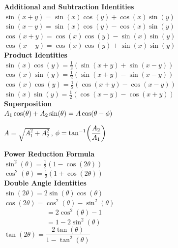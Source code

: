 \documentclass[11pt]{article}
\begin{document}
\begin{multicols}{2}
  \textbf{Additional and Subtraction Identities}\\
  \(\sin(x + y) = \sin(x)\cos(y) + \cos(x)\sin(y)\) \vspace{6pt} \\
  \(\sin(x - y) = \sin(x)\cos(y) - \cos(x)\sin(y)\) \vspace{6pt} \\
  \(\cos(x + y) = \cos(x)\cos(y) - \sin(x)\sin(y)\) \vspace{6pt} \\
  \(\cos(x - y) = \cos(x)\cos(y) + \sin(x)\sin(y)\) \\

  \textbf{Product Identities}\\
  \(\sin(x)\cos(y) = \frac{1}{2}(\sin(x + y) + \sin(x - y))\) \vspace{6pt}\\
  \(\cos(x)\sin(y) = \frac{1}{2}(\sin(x + y) - \sin(x - y))\) \vspace{6pt}\\
  \(\cos(x)\cos(y) = \frac{1}{2}(\cos(x + y) - \cos(x - y))\) \vspace{6pt}\\
  \(\sin(x)\sin(y) = \frac{1}{2}(\cos(x - y) - \cos(x + y))\) \\

  \textbf{Superposition}\\
  \(A_1\cos(\theta) + A_2\sin(\theta) = A\,{\cos}{\left( \theta - \phi \right)}\)

  \(A = \sqrt{A_1^2 + A_2^2}\,\),
  \(\phi = {\tan^{-1}}{\left( \dfrac{A_2}{A_1} \right)}\)

  \columnbreak

  \textbf{Power Reduction Formula}\\
  \(\sin^2(\theta) = \frac{1}{2}(1 - \cos(2\theta))\) \vspace{6pt}\\
  \(\cos^2(\theta) = \frac{1}{2}(1 + \cos(2\theta))\) \\

  \textbf{Double Angle Identities}\\
  \(\sin(2\theta) = 2\sin(\theta)\cos(\theta)\) \\
  \(\cos(2\theta) = \cos^2(\theta) - \sin^2(\theta)\) \\
  \(\textrm{ }\textrm{ }\textrm{ }\textrm{ }\textrm{ }\textrm{ }\textrm{ }\textrm{ }\textrm{ }\,
  = 2\cos^2(\theta) - 1\) \\
  \(\textrm{ }\textrm{ }\textrm{ }\textrm{ }\textrm{ }\textrm{ }\textrm{ }\textrm{ }\textrm{ }\,
  = 1 - 2\sin^2(\theta)\) \vspace{6pt} \\
  \(\tan(2\theta) = \dfrac{2\tan(\theta)}{1 - \tan^2(\theta)}\)
  \vspace{6pt}\\


\end{multicols}
\end{document}
